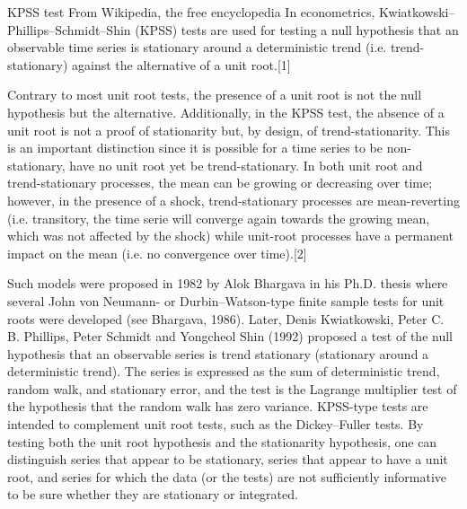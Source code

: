 KPSS test
From Wikipedia, the free encyclopedia
In econometrics, Kwiatkowski–Phillips–Schmidt–Shin (KPSS) tests are used for testing a null hypothesis that an observable time series is stationary around a deterministic trend (i.e. trend-stationary) against the alternative of a unit root.[1]

Contrary to most unit root tests, the presence of a unit root is not the null hypothesis but the alternative. Additionally, in the KPSS test, the absence of a unit root is not a proof of stationarity but, by design, of trend-stationarity. This is an important distinction since it is possible for a time series to be non-stationary, have no unit root yet be trend-stationary. In both unit root and trend-stationary processes, the mean can be growing or decreasing over time; however, in the presence of a shock, trend-stationary processes are mean-reverting (i.e. transitory, the time serie will converge again towards the growing mean, which was not affected by the shock) while unit-root processes have a permanent impact on the mean (i.e. no convergence over time).[2]

Such models were proposed in 1982 by Alok Bhargava in his Ph.D. thesis where several John von Neumann- or Durbin–Watson-type finite sample tests for unit roots were developed (see Bhargava, 1986). Later, Denis Kwiatkowski, Peter C. B. Phillips, Peter Schmidt and Yongcheol Shin (1992) proposed a test of the null hypothesis that an observable series is trend stationary (stationary around a deterministic trend). The series is expressed as the sum of deterministic trend, random walk, and stationary error, and the test is the Lagrange multiplier test of the hypothesis that the random walk has zero variance. KPSS-type tests are intended to complement unit root tests, such as the Dickey–Fuller tests. By testing both the unit root hypothesis and the stationarity hypothesis, one can distinguish series that appear to be stationary, series that appear to have a unit root, and series for which the data (or the tests) are not sufficiently informative to be sure whether they are stationary or integrated.
